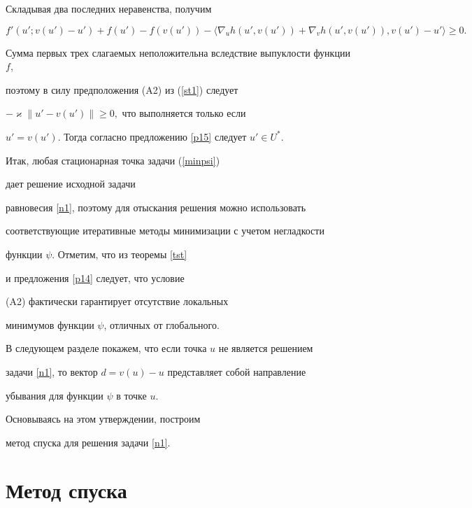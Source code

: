 \begin{pf}
Складывая два последних неравенства, получим


\begin{equation} \label{st1}


f'(u'; v(u')-u') +f(u') - f(v(u')) - 


\langle \nabla_u h(u',v(u')) + \nabla_v h(u',v(u')), v(u') -


u' \rangle \ge 0.  


\end{equation}


Сумма первых трех слагаемых неположительна вследствие выпуклости функции $f$,


поэтому в силу предположения (A2) из (\ref{st1}) следует 


$ -\varkappa \|u'-v(u')\| \ge 0,$ что выполняется только если 


$u'=v(u')$. Тогда согласно предложению \ref{p15} следует $u' \in U^*.$ 


\end{pf}





Итак, любая стационарная точка задачи (\ref{minpsi}) 


дает решение исходной задачи 


равновесия \ref{n1}, поэтому для отыскания решения можно использовать 


соответствующие итеративные методы минимизации с учетом негладкости 


функции $\psi$. Отметим, что из теоремы \ref{tst} 


и предложения \ref{p14} следует, что условие 


(A2) фактически гарантирует отсутствие локальных 


минимумов функции $\psi$, отличных от глобального.





В следующем разделе покажем, что если точка $u$ не является решением 


задачи \ref{n1}, то вектор $d = v(u) - u$ представляет собой направление 


убывания для функции $\psi$ в точке $u$. 


Основываясь на этом утверждении, построим


метод спуска для решения задачи \ref{n1}.





\section{Метод спуска}





